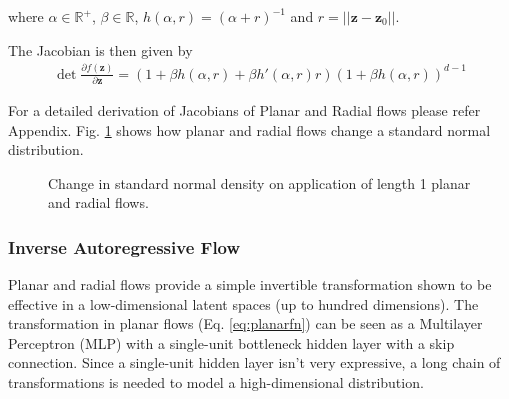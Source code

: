 \documentclass[runningheads]{llncs}
\begin{document}
where $\alpha \in \mathbb{R}^+$, $\beta \in \mathbb{R}$, $h(\alpha,r) = (\alpha + r)^{-1}$ and $r = \vert\vert\mathbf{z} - \mathbf{z}_0\vert\vert$.

The Jacobian is then given by
\begin{align}
\det\frac{\partial f(\mathbf{z})}{\partial \mathbf{z}} = \left(1 + \beta h(\alpha,r) + \beta h'(\alpha,r)r\right)(1+\beta h(\alpha,r))^{d-1}
\end{align}

For a detailed derivation of Jacobians of Planar and Radial flows please refer Appendix. Fig. \ref{fig:planarradial} shows how planar and radial flows change a standard normal distribution.

\begin{figure}
	\centering
	\caption{Change in standard normal density on application of length 1 planar and radial flows.}
	\label{fig:planarradial}
\end{figure}

\subsubsection{Inverse Autoregressive Flow} Planar and radial flows provide a simple invertible transformation shown to be effective in a low-dimensional latent spaces (up to hundred dimensions). The transformation in planar flows (Eq. \ref{eq:planarfn}) can be seen as a Multilayer Perceptron (MLP) with a single-unit bottleneck hidden layer with a skip connection. Since a single-unit hidden layer isn't very expressive, a long chain of transformations is needed to model a high-dimensional distribution. 
\end{document}
